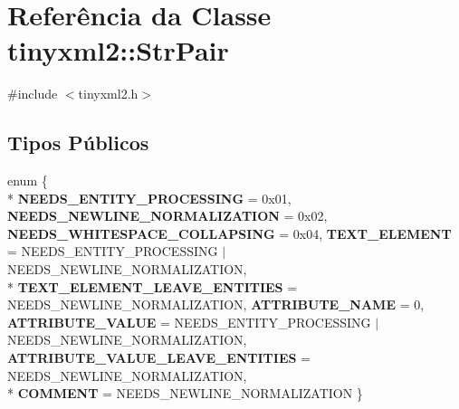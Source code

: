 \section{Referência da Classe tinyxml2\+:\+:Str\+Pair}
\label{classtinyxml2_1_1_str_pair}


{\ttfamily \#include $<$tinyxml2.\+h$>$}

\subsection*{Tipos Públicos}
\begin{DoxyCompactItemize}
\item 
enum \{ \\*
{\bf N\+E\+E\+D\+S\+\_\+\+E\+N\+T\+I\+T\+Y\+\_\+\+P\+R\+O\+C\+E\+S\+S\+I\+NG} = 0x01, 
{\bf N\+E\+E\+D\+S\+\_\+\+N\+E\+W\+L\+I\+N\+E\+\_\+\+N\+O\+R\+M\+A\+L\+I\+Z\+A\+T\+I\+ON} = 0x02, 
{\bf N\+E\+E\+D\+S\+\_\+\+W\+H\+I\+T\+E\+S\+P\+A\+C\+E\+\_\+\+C\+O\+L\+L\+A\+P\+S\+I\+NG} = 0x04, 
{\bf T\+E\+X\+T\+\_\+\+E\+L\+E\+M\+E\+NT} = N\+E\+E\+D\+S\+\_\+\+E\+N\+T\+I\+T\+Y\+\_\+\+P\+R\+O\+C\+E\+S\+S\+I\+NG $\vert$ N\+E\+E\+D\+S\+\_\+\+N\+E\+W\+L\+I\+N\+E\+\_\+\+N\+O\+R\+M\+A\+L\+I\+Z\+A\+T\+I\+ON, 
\\*
{\bf T\+E\+X\+T\+\_\+\+E\+L\+E\+M\+E\+N\+T\+\_\+\+L\+E\+A\+V\+E\+\_\+\+E\+N\+T\+I\+T\+I\+ES} = N\+E\+E\+D\+S\+\_\+\+N\+E\+W\+L\+I\+N\+E\+\_\+\+N\+O\+R\+M\+A\+L\+I\+Z\+A\+T\+I\+ON, 
{\bf A\+T\+T\+R\+I\+B\+U\+T\+E\+\_\+\+N\+A\+ME} = 0, 
{\bf A\+T\+T\+R\+I\+B\+U\+T\+E\+\_\+\+V\+A\+L\+UE} = N\+E\+E\+D\+S\+\_\+\+E\+N\+T\+I\+T\+Y\+\_\+\+P\+R\+O\+C\+E\+S\+S\+I\+NG $\vert$ N\+E\+E\+D\+S\+\_\+\+N\+E\+W\+L\+I\+N\+E\+\_\+\+N\+O\+R\+M\+A\+L\+I\+Z\+A\+T\+I\+ON, 
{\bf A\+T\+T\+R\+I\+B\+U\+T\+E\+\_\+\+V\+A\+L\+U\+E\+\_\+\+L\+E\+A\+V\+E\+\_\+\+E\+N\+T\+I\+T\+I\+ES} = N\+E\+E\+D\+S\+\_\+\+N\+E\+W\+L\+I\+N\+E\+\_\+\+N\+O\+R\+M\+A\+L\+I\+Z\+A\+T\+I\+ON, 
\\*
{\bf C\+O\+M\+M\+E\+NT} = N\+E\+E\+D\+S\+\_\+\+N\+E\+W\+L\+I\+N\+E\+\_\+\+N\+O\+R\+M\+A\+L\+I\+Z\+A\+T\+I\+ON
 \}
\end{DoxyCompactItemize}
